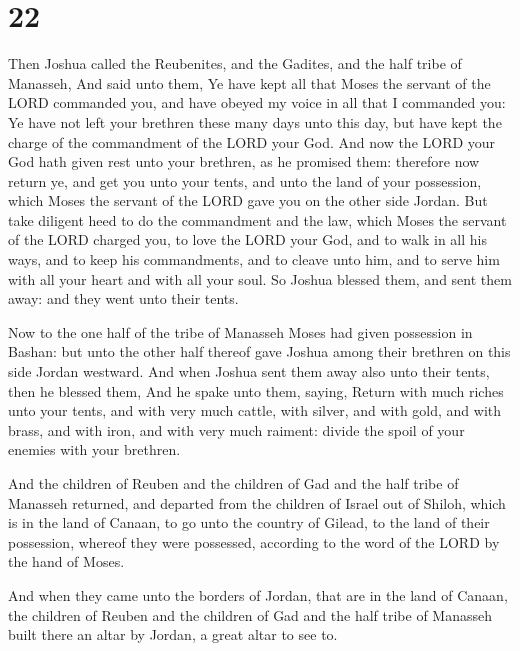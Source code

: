 \hypertarget{section-21}{%
\section{22}\label{section-21}}

 Then Joshua called the Reubenites, and the Gadites, and the
half tribe of Manasseh,  And said unto them, Ye have kept
all that Moses the servant of the LORD commanded you, and have obeyed my
voice in all that I commanded you:  Ye have not left your
brethren these many days unto this day, but have kept the charge of the
commandment of the LORD your God.  And now the LORD your God
hath given rest unto your brethren, as he promised them: therefore now
return ye, and get you unto your tents, and unto the land of your
possession, which Moses the servant of the LORD gave you on the other
side Jordan.  But take diligent heed to do the commandment
and the law, which Moses the servant of the LORD charged you, to love
the LORD your God, and to walk in all his ways, and to keep his
commandments, and to cleave unto him, and to serve him with all your
heart and with all your soul.  So Joshua blessed them, and
sent them away: and they went unto their tents.

 Now to the one half of the tribe of Manasseh Moses had
given possession in Bashan: but unto the other half thereof gave Joshua
among their brethren on this side Jordan westward. And when Joshua sent
them away also unto their tents, then he blessed them,  And
he spake unto them, saying, Return with much riches unto your tents, and
with very much cattle, with silver, and with gold, and with brass, and
with iron, and with very much raiment: divide the spoil of your enemies
with your brethren.

 And the children of Reuben and the children of Gad and the
half tribe of Manasseh returned, and departed from the children of
Israel out of Shiloh, which is in the land of Canaan, to go unto the
country of Gilead, to the land of their possession, whereof they were
possessed, according to the word of the LORD by the hand of Moses.

 And when they came unto the borders of Jordan, that are in
the land of Canaan, the children of Reuben and the children of Gad and
the half tribe of Manasseh built there an altar by Jordan, a great altar
to see to.


